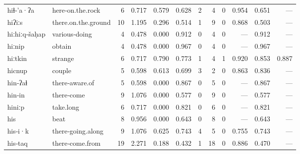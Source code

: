\begin{landscape}
\begin{longtable}[c]{ l l | r r c c | r r r | r r r }
  hiɬ‑'a·ʔa          & here‑on.the.rock          & 6   & 0.717                     & 0.579           & 0.628      & 2         & 4           & 0            & 0.954     & 0.651       & —\\
  hiʔiːs             & there.on.the.ground       & 10  & 1.195                     & 0.296           & 0.514      & 1         & 9           & 0            & 0.868     & 0.503       & —\\
  hiːhiːq‑šaḥap      & various‑doing             & 4   & 0.478                     & 0.000           & 0.912      & 0         & 4           & 0            & —         & 0.912       & —\\
  hiːnip             & obtain                    & 4   & 0.478                     & 0.000           & 0.967      & 0         & 4           & 0            & —         & 0.967       & —\\
  hiːtkin            & strange                   & 6   & 0.717                     & 0.790           & 0.773      & 1         & 4           & 1            & 0.920     & 0.853       & 0.887\\
  hicnup             & couple                    & 5   & 0.598                     & 0.613           & 0.699      & 3         & 2           & 0            & 0.863     & 0.836       & —\\
  hin‑ʔaɬ            & there‑aware.of            & 5   & 0.598                     & 0.000           & 0.867      & 0         & 5           & 0            & —         & 0.867       & —\\
  hin‑in             & there‑come                & 9   & 1.076                     & 0.000           & 0.577      & 0         & 9           & 0            & —         & 0.577       & —\\
  hiniːp             & take.long                 & 6   & 0.717                     & 0.000           & 0.821      & 0         & 6           & 0            & —         & 0.821       & —\\
  his                & beat                      & 8   & 0.956                     & 0.000           & 0.643      & 0         & 8           & 0            & —         & 0.643       & —\\
  his‑i·k            & there‑going.along         & 9   & 1.076                     & 0.625           & 0.743      & 4         & 5           & 0            & 0.755     & 0.743       & —\\
  his‑taq            & there‑come.from           & 19  & 2.271                     & 0.188           & 0.432      & 1         & 18          & 0            & 0.886     & 0.470       & —\\

\end{longtable}
\end{landscape}
